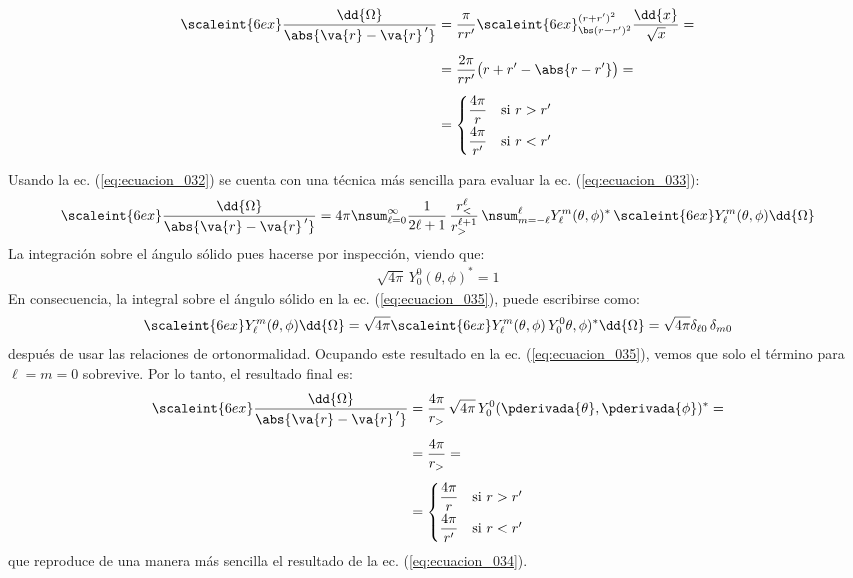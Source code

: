 \begin{align}
\begin{aligned}[b]
\scaleint{6ex} \dfrac{\dd{\Omega}}{\abs{\va{r} - \va{r}^{\, \prime}}} &= \dfrac{\pi}{r r^{\prime}} \scaleint{6ex}_{\bs (r - r^{\prime})^{2}}^{(r + r^{\prime})^{2}} \dfrac{\dd{x}}{\sqrt{x}} = \\[0.5em]
&= \dfrac{2 \pi}{r r^{\prime}} \big( r + r^{\prime} - \abs{r - r^{\prime}} \big) = \\[0.5em]
&= \begin{cases}
\dfrac{4 \pi}{r} & \mbox{si } r > r^{\prime} \\[0.5em]
\dfrac{4 \pi}{r^{\prime}} & \mbox{si } r < r^{\prime}
\end{cases}
\end{aligned}
\label{eq:ecuacion_034}
\end{align}

Usando la ec. (\ref{eq:ecuacion_032}) se cuenta con una técnica más sencilla para evaluar la ec. (\ref{eq:ecuacion_033}):
\begin{align}
\scaleint{6ex} \dfrac{\dd{\Omega}}{\abs{\va{r} - \va{r}^{\, \prime}}} = 4 \pi \nsum_{\ell=0}^{\infty} \dfrac{1}{2 \ell + 1} \, \dfrac{r_{<}^{\ell}}{r_{>}^{\ell+1}} \, \nsum_{m=-\ell}^{\ell} Y_{\ell}^{m} (\theta, \phi)^{*} \, \scaleint{6ex} Y_{\ell}^{m} (\theta, \phi) \dd{\Omega}
\label{eq:ecuacion_035}
\end{align}
La integración sobre el ángulo sólido pues hacerse por inspección, viendo que:
\begin{align}
\sqrt{4 \pi} \, Y_{0}^{0} (\theta, \phi)^{*} = 1
\end{align}
En consecuencia, la integral sobre el ángulo sólido en la ec. (\ref{eq:ecuacion_035}), puede escribirse como:
\begin{align*}
\scaleint{6ex} Y_{\ell}^{m} (\theta, \phi) \dd{\Omega} = \sqrt{4 \pi} \scaleint{6ex} Y_{\ell}^{m} (\theta, \phi) \, Y_{0}^{0} \theta, \phi)^{*} \dd{\Omega} = \sqrt{4 \pi} \delta_{\ell 0} \, \delta_{m 0}
\end{align*}
después de usar las relaciones de ortonormalidad. Ocupando este resultado en la ec. (\ref{eq:ecuacion_035}), vemos que solo el término para $\ell = m = 0$ sobrevive. Por lo tanto, el resultado final es:
\begin{align}
\begin{aligned}
\scaleint{6ex} \dfrac{\dd{\Omega}}{\abs{\va{r} - \va{r}^{\, \prime}}} &= \dfrac{4 \pi}{r_{>}} \, \sqrt{4 \pi} \, Y_{0}^{0} (\pderivada{\theta}, \pderivada{\phi})^{*} = \\[0.5em]
&= \dfrac{4 \pi}{r_{>}} = \\[0.5em]
&= \begin{cases}
\dfrac{4 \pi}{r} & \mbox{si } r > r^{\prime} \\[0.5em]
\dfrac{4 \pi}{r^{\prime}} & \mbox{si } r < r^{\prime}
\end{cases}
\end{aligned}
\end{align}
que reproduce de una manera más sencilla el resultado de la ec. (\ref{eq:ecuacion_034}).

